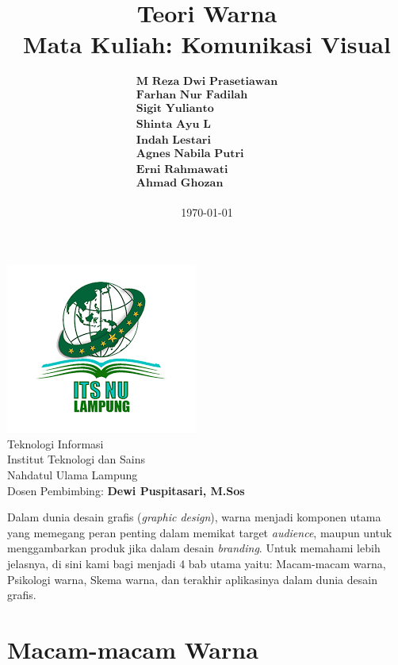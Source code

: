 \documentclass[a4paper]{article}
\title{
  \vspace{-3cm}
  \centering
  \vspace{1cm}
  \textbf{Teori Warna}\\
  \large Mata Kuliah: \textbf{Komunikasi Visual}
}
\author{$\begin{array}{c}
  \textbf{M Reza Dwi Prasetiawan}\\
  \textbf{Farhan Nur Fadilah}\\
  \textbf{Sigit Yulianto}\\
  \textbf{Shinta Ayu L}\\
  \textbf{Indah Lestari}\\
  \textbf{Agnes Nabila Putri}\\
  \textbf{Erni Rahmawati}\\
  \textbf{Ahmad Ghozan}\\
\end{array}$
}
\date{\today}
\begin{document}
\begin{titlepage}
  \maketitle
  \vfill
  \begin{center}
    \includegraphics[width=\textwidth]{resources/logo-univ.png}\\
    \large
    Teknologi Informasi\\
    Institut Teknologi dan Sains\\
    Nahdatul Ulama Lampung\\
    Dosen Pembimbing: \textbf{Dewi Puspitasari, M.Sos}
  \end{center}
\end{titlepage}

\newpage
{}
\tableofcontents
\newpage

Dalam dunia desain grafis (\textit{graphic design}), warna menjadi komponen utama yang memegang peran penting dalam memikat target \textit{audience}, maupun untuk menggambarkan produk jika dalam desain \textit{branding}. Untuk memahami lebih jelasnya, di sini kami bagi menjadi 4 bab utama yaitu: Macam-macam warna, Psikologi warna, Skema warna, dan terakhir aplikasinya dalam dunia desain grafis.

\section{Macam-macam Warna}
\end{document}
